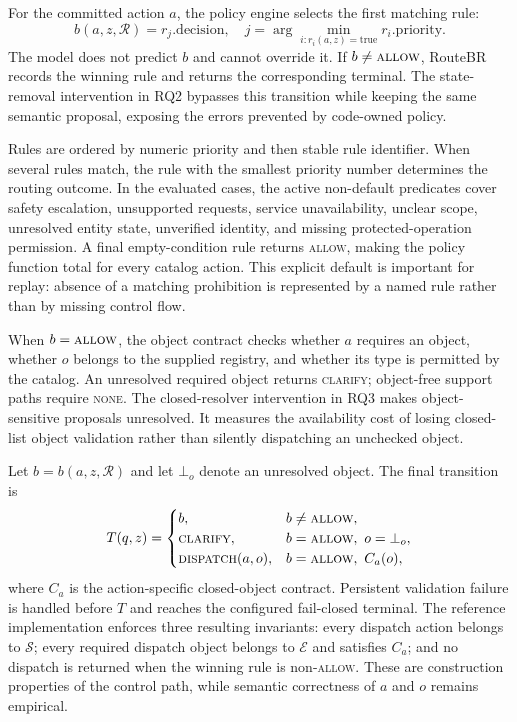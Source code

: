 \documentclass[10pt,conference,a4paper]{IEEEtran}
\newcommand{\method}{RouteBR}
\begin{document}
For the committed action $a$, the policy engine selects the first matching rule:
\begin{equation}
b(a,z,\mathcal{R})=r_j.\mathrm{decision},\quad
j=\arg\min_{i:r_i(a,z)=\mathrm{true}} r_i.\mathrm{priority}.
\end{equation}
The model does not predict $b$ and cannot override it. If $b\neq\textsc{allow}$, \method{} records the winning rule and returns the corresponding terminal. The state-removal intervention in RQ2 bypasses this transition while keeping the same semantic proposal, exposing the errors prevented by code-owned policy.

Rules are ordered by numeric priority and then stable rule identifier. When several rules match, the rule with the smallest priority number determines the routing outcome. In the evaluated cases, the active non-default predicates cover safety escalation, unsupported requests, service unavailability, unclear scope, unresolved entity state, unverified identity, and missing protected-operation permission. A final empty-condition rule returns \textsc{allow}, making the policy function total for every catalog action. This explicit default is important for replay: absence of a matching prohibition is represented by a named rule rather than by missing control flow.

When $b=\textsc{allow}$, the object contract checks whether $a$ requires an object, whether $o$ belongs to the supplied registry, and whether its type is permitted by the catalog. An unresolved required object returns \textsc{clarify}; object-free support paths require \textsc{none}. The closed-resolver intervention in RQ3 makes object-sensitive proposals unresolved. It measures the availability cost of losing closed-list object validation rather than silently dispatching an unchecked object.

Let $b=b(a,z,\mathcal{R})$ and let $\bot_o$ denote an unresolved object. The final transition is
\begin{equation}
T(q,z)=
\begin{cases}
b, & b\neq\textsc{allow},\\
\textsc{clarify}, & b=\textsc{allow},\ o=\bot_o,\\
\textsc{dispatch}(a,o), & b=\textsc{allow},\ C_{a}(o),
\end{cases}
\end{equation}
where $C_a$ is the action-specific closed-object contract. Persistent validation failure is handled before $T$ and reaches the configured fail-closed terminal. The reference implementation enforces three resulting invariants: every dispatch action belongs to $\mathcal{S}$; every required dispatch object belongs to $\mathcal{E}$ and satisfies $C_a$; and no dispatch is returned when the winning rule is non-\textsc{allow}. These are construction properties of the control path, while semantic correctness of $a$ and $o$ remains empirical.
\end{document}
